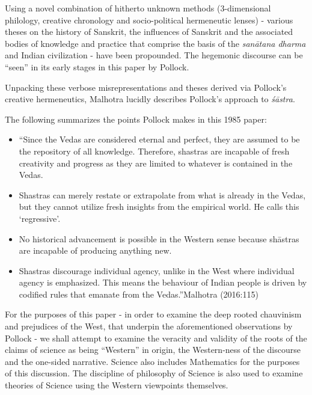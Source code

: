 Using a novel combination of hitherto unknown methods (3-dimen\-sion\-al philology, creative chronology and socio-political hermeneutic lenses) - various theses on the history of Sanskrit, the influences of Sanskrit and the associated bodies of knowledge and practice that comprise the basis of the \textit{sanātana dharma} and Indian civilization - have been propounded. The hegemonic discourse can be “seen” in its early stages in this paper by Pollock.

Unpacking these verbose misrepresentations and theses derived via Pollock’s creative hermeneutics, Malhotra lucidly describes Pollock’s approach to \textit{śāstra}.

The following summarizes the points Pollock makes in this 1985 paper:

\begin{itemize}
\item “Since the Vedas are considered eternal and perfect, they are assumed to be the repository of all knowledge. Therefore, shastras are incapable of fresh creativity and progress as they are limited to whatever is contained in the Vedas.

 \item Shastras can merely restate or extrapolate from what is already in the Vedas, but they cannot utilize fresh insights from the empirical world. He calls this ‘regressive’.

 \item No historical advancement is possible in the Western sense because shāstras are incapable of producing anything new.

 \item Shastras discourage individual agency, unlike in the West where individual agency is emphasized. This means the behaviour of Indian people is driven by codified rules that emanate from the Vedas.”\hfill Malhotra (2016:115)

\end{itemize}

For the purposes of this paper - in order to examine the deep rooted chauvinism and prejudices of the West, that underpin the aforementioned observations by Pollock - we shall attempt to examine the veracity and validity of the roots of the claims of science as being “Western” in origin, the Western-ness of the discourse and the one-sided narrative. Science also includes Mathematics for the purposes of this discussion. The discipline of philosophy of Science is also used to examine theories of Science using the Western viewpoints themselves.

